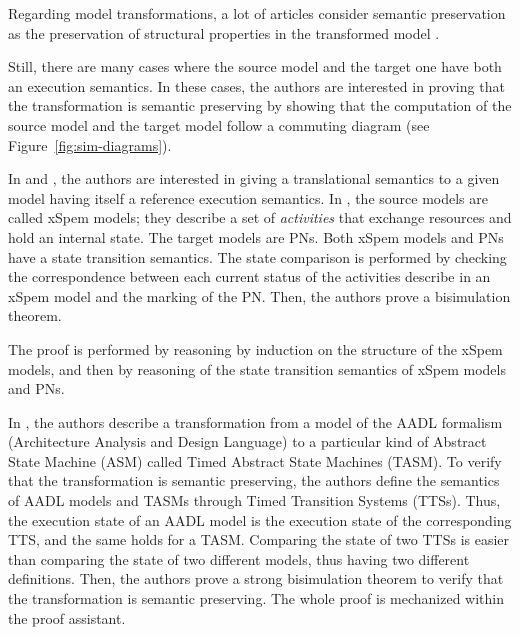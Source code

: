\documentclass[pdflatex,sn-mathphys]{sn-jnl}%
\theoremstyle{thmstyleone}%
\theoremstyle{thmstyletwo}%
\theoremstyle{thmstylethree}%
\begin{document}
Regarding model transformations, a lot of articles consider semantic
preservation as the preservation of structural properties in the
transformed model \cite{Berramla2015,Calegari2011,Meghzili2017}.

Still, there are many cases where the source model and the target one
have both an execution semantics. In these cases, the authors are
interested in proving that the transformation is semantic preserving
by showing that the computation of the source model and the target
model follow a commuting diagram (see Figure~\ref{fig:sim-diagrams}).

In \cite{Combemale2009} and \cite{Yang2014}, the authors are
interested in giving a translational semantics to a given model having
itself a reference execution semantics. In \cite{Combemale2009}, the
source models are called xSpem models; they describe a set of
\emph{activities} that exchange resources and hold an internal
state. The target models are PNs. Both xSpem models and PNs have a
state transition semantics. The state comparison is performed by
checking the correspondence between each current status of the
activities describe in an xSpem model and the marking of the PN. Then,
the authors prove a bisimulation theorem. %

The proof is performed by reasoning by induction on the structure of
the xSpem models, and then by reasoning of the state transition
semantics of xSpem models and PNs.

In \cite{Yang2014}, the authors describe a transformation from a model
of the AADL formalism (Architecture Analysis and Design Language) to a
particular kind of Abstract State Machine (ASM) called Timed Abstract
State Machines (TASM). To verify that the transformation is semantic
preserving, the authors define the semantics of AADL models and TASMs
through Timed Transition Systems (TTSs). Thus, the execution state of
an AADL model is the execution state of the corresponding TTS, and the
same holds for a TASM. Comparing the state of two TTSs is easier than
comparing the state of two different models, thus having two different
definitions. Then, the authors prove a strong bisimulation theorem to
verify that the transformation is semantic preserving. The whole proof
is mechanized within the \coq{} proof assistant.
\end{document}
